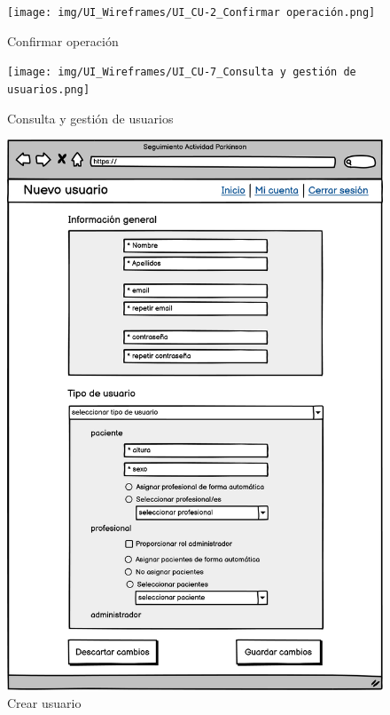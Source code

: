 \begin{figure}[h]
    \centering
    \texttt{[image: img/UI\_Wireframes/UI\_CU-2\_Confirmar operación.png]}
    \caption{Confirmar operación}
    \label{fig:Confirmar operación}
\end{figure}

\begin{figure}[h]
    \centering
    \texttt{[image: img/UI\_Wireframes/UI\_CU-7\_Consulta y gestión de usuarios.png]}
    \caption{Consulta y gestión de usuarios}
    \label{fig:Consulta y gestión de usuarios}
\end{figure}

\begin{figure}[h]
    \centering
    \includegraphics[width=1\textwidth]{img/UI_Wireframes/UI_CU-9_Crear usuario.png}
    \caption{Crear usuario}
    \label{fig:Crear usuario}
\end{figure}

